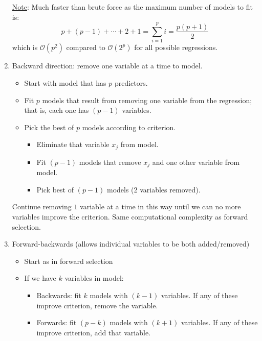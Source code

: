 \begin{enumerate}[label=(\roman*)]
            \underline{Note}: Much faster than brute force as the
            maximum number of models to fit is:
            \[ p+(p-1)+\cdots+2+1=\sum_{i=1}^{p}i=\frac{p(p+1)}{2} \]
            which is $ \mathcal{O}(p^2) $ compared to $ \mathcal{O}(2^p) $
            for all possible regressions.
      \item Backward direction: remove one variable at a time to model.
            \begin{itemize}
                  \item Start with model that has $ p $ predictors.
                  \item Fit $ p $ models that result from removing one variable
                        from the regression; that is, each one has $ (p-1) $
                        variables.
                  \item Pick the best of $ p $ models according to criterion.
                        \begin{itemize}
                              \item Eliminate that variable $ x_j $ from model.
                              \item Fit $ (p-1) $ models that remove $ x_j $
                                    and one other variable from model.
                              \item Pick best of $ (p-1) $ models
                                    (2 variables removed).
                        \end{itemize}
            \end{itemize}
            Continue removing $ 1 $ variable at a time in this way until
            we can no more variables improve the criterion. Same computational
            complexity as forward selection.
      \item Forward-backwards (allows individual variables to be both added/removed)
            \begin{itemize}
                  \item Start as in forward selection
                  \item If we have $ k $ variables in model:
                        \begin{itemize}
                              \item Backwards: fit $ k $ models with $ (k-1) $
                                    variables. If any of these improve criterion,
                                    remove the variable.
                              \item Forwards: fit $ (p-k) $ models with $ (k+1) $
                                    variables. If any of these improve criterion,
                                    add that variable.
                        \end{itemize}
            \end{itemize}
\end{enumerate}
